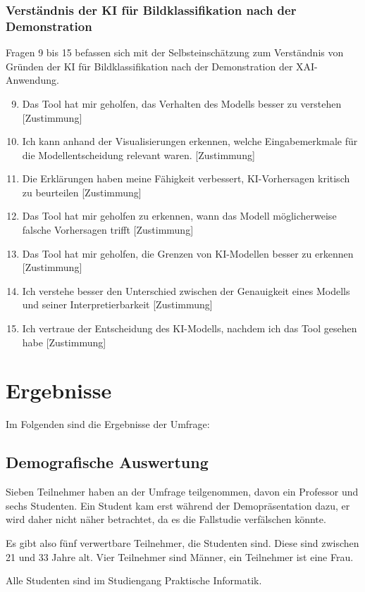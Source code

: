 \subsubsection{Verständnis der KI für Bildklassifikation nach der Demonstration}
Fragen 9 bis 15 befassen sich mit der Selbsteinschätzung zum Verständnis von Gründen der KI für Bildklassifikation nach der Demonstration der XAI-Anwendung.
\begin{enumerate}
    \setcounter{enumi}{8}
    \item  Das Tool hat mir geholfen, das Verhalten des Modells besser zu verstehen [Zustimmung]
    \item  Ich kann anhand der Visualisierungen erkennen, welche Eingabemerkmale für die Modellentscheidung relevant waren. [Zustimmung]
    \item  Die Erklärungen haben meine Fähigkeit verbessert, KI-Vorhersagen kritisch zu beurteilen [Zustimmung]
    \item  Das Tool hat mir geholfen zu erkennen, wann das Modell möglicherweise falsche Vorhersagen trifft [Zustimmung]
    \item  Das Tool hat mir geholfen, die Grenzen von KI-Modellen besser zu erkennen [Zustimmung]
    \item  Ich verstehe besser den Unterschied zwischen der Genauigkeit eines Modells und seiner Interpretierbarkeit [Zustimmung]
    \item  Ich vertraue der Entscheidung des KI-Modells, nachdem ich das Tool gesehen habe [Zustimmung]
   \end{enumerate}
 \section{Ergebnisse}  
Im Folgenden sind die Ergebnisse der Umfrage:

\subsection{Demografische Auswertung}
Sieben Teilnehmer haben an der Umfrage teilgenommen, davon ein Professor und sechs Studenten. Ein Student kam erst während der Demopräsentation dazu, er wird daher nicht näher betrachtet, da es die Fallstudie verfälschen könnte.

Es gibt also fünf verwertbare Teilnehmer, die Studenten sind. Diese sind zwischen 21 und 33 Jahre alt. Vier Teilnehmer sind Männer, ein Teilnehmer ist eine Frau. 

Alle Studenten sind im Studiengang Praktische Informatik. 

